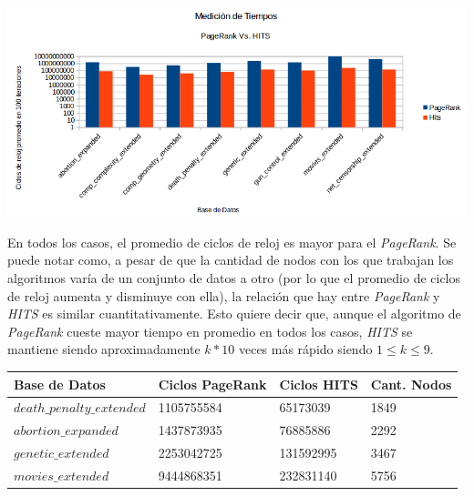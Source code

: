 	\par 
	\begin{center}
		\includegraphics[scale=0.5]{./img/medicionesTiempo1.png}
	\end{center}
	
	\par 

En todos los casos, el promedio de ciclos de reloj es  mayor para el \textit{PageRank}. Se puede notar como, a pesar de que la cantidad de nodos con los que trabajan los algoritmos varía de un conjunto de datos a otro (por lo que el promedio de ciclos de reloj aumenta y disminuye con ella), la relación que hay entre \textit{PageRank} y \textit{HITS} es similar cuantitativamente. Esto quiere decir que, aunque el algoritmo de \textit{PageRank} cueste mayor tiempo en promedio en todos los casos, \textit{HITS} se mantiene siendo aproximadamente $k*10$ veces más rápido siendo $1 \leq k \leq 9$. 
\par 

\begin{center}
    \begin{tabular}{| l | l | l | l |}
    \hline
    Base de Datos & Ciclos PageRank & Ciclos HITS & Cant. Nodos \\ \hline
    $death\_penalty\_extended$ & 1105755584 & 65173039 & 1849 \\ \hline
    $abortion\_expanded$ & 1437873935 & 76885886 & 2292 \\ \hline
	$genetic\_extended$ & 2253042725 & 131592995 & 3467 \\ \hline
	$movies\_extended$ & 9444868351 & 232831140	& 5756 \\ \hline
    \end{tabular}
\end{center}

